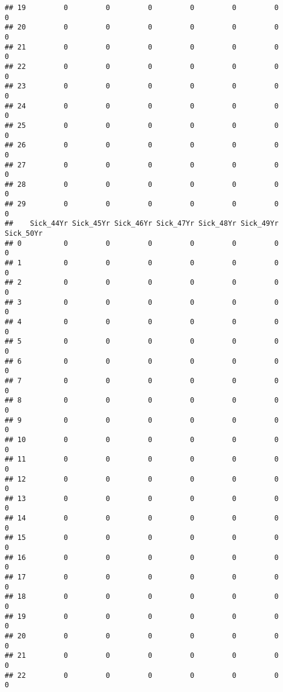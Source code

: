 \documentclass[
]{article}
\begin{document}
\begin{verbatim}
## 19         0         0         0         0         0         0         0
## 20         0         0         0         0         0         0         0
## 21         0         0         0         0         0         0         0
## 22         0         0         0         0         0         0         0
## 23         0         0         0         0         0         0         0
## 24         0         0         0         0         0         0         0
## 25         0         0         0         0         0         0         0
## 26         0         0         0         0         0         0         0
## 27         0         0         0         0         0         0         0
## 28         0         0         0         0         0         0         0
## 29         0         0         0         0         0         0         0
##    Sick_44Yr Sick_45Yr Sick_46Yr Sick_47Yr Sick_48Yr Sick_49Yr Sick_50Yr
## 0          0         0         0         0         0         0         0
## 1          0         0         0         0         0         0         0
## 2          0         0         0         0         0         0         0
## 3          0         0         0         0         0         0         0
## 4          0         0         0         0         0         0         0
## 5          0         0         0         0         0         0         0
## 6          0         0         0         0         0         0         0
## 7          0         0         0         0         0         0         0
## 8          0         0         0         0         0         0         0
## 9          0         0         0         0         0         0         0
## 10         0         0         0         0         0         0         0
## 11         0         0         0         0         0         0         0
## 12         0         0         0         0         0         0         0
## 13         0         0         0         0         0         0         0
## 14         0         0         0         0         0         0         0
## 15         0         0         0         0         0         0         0
## 16         0         0         0         0         0         0         0
## 17         0         0         0         0         0         0         0
## 18         0         0         0         0         0         0         0
## 19         0         0         0         0         0         0         0
## 20         0         0         0         0         0         0         0
## 21         0         0         0         0         0         0         0
## 22         0         0         0         0         0         0         0

\end{verbatim}
\end{document}
